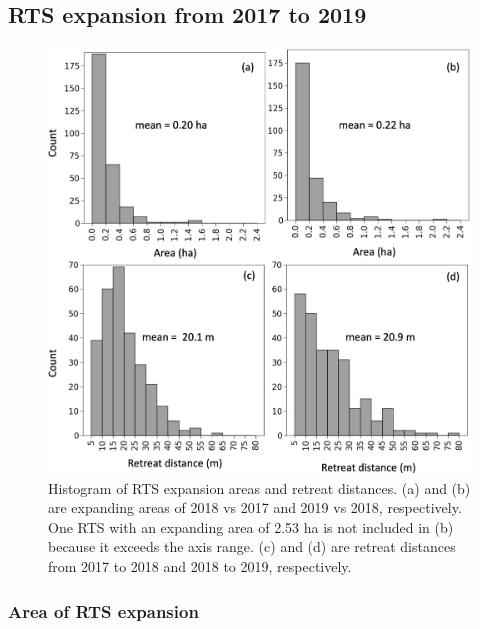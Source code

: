 \documentclass[authoryear,preprint,review,12pt]{elsarticle}
\begin{document}


\subsection{RTS expansion from 2017 to 2019}
\label{sec_rts_expanding}

\begin{figure} 
	\centering
	\includegraphics[width=14cm]{figs/rts_change_area_dis_manu_v2_trim.jpg}
	\caption{Histogram of RTS expansion areas and retreat distances. (a) and (b) are expanding areas of 2018 vs 2017 and 2019 vs 2018, respectively. One RTS with an expanding area of 2.53 ha is not included in (b) because it exceeds the axis range. (c) and (d) are retreat distances from 2017 to 2018 and 2018 to 2019, respectively.}
	\label{fig_rts_change_area_reDis}
\end{figure}

\subsubsection{Area of RTS expansion}
\label{sec_rts_change_area}
\end{document}
